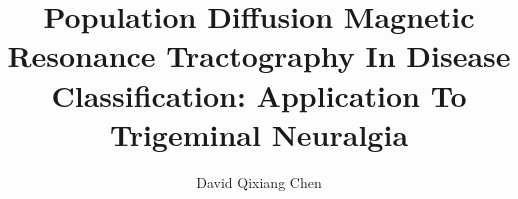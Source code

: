 \documentclass[12pt]{ut-thesis}
\begin{document}
\nobibliography*
\begin{preliminary}
    

\author{David Qixiang Chen}
\title{Population Diffusion Magnetic Resonance Tractography In Disease Classification: Application To Trigeminal Neuralgia}

\maketitle
\tableofcontents

\end{preliminary}















\end{document}
